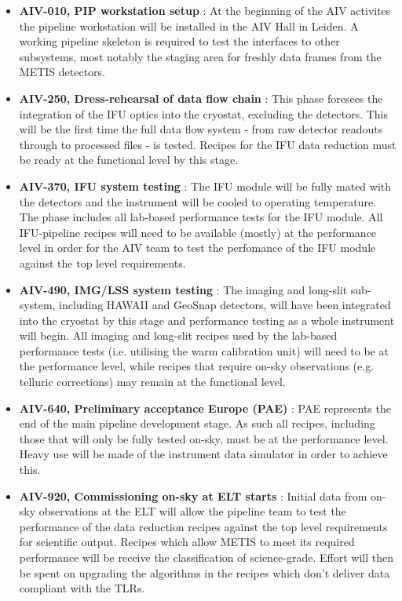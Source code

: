 \documentclass[a4paper]{spie}  %
\begin{document}
\begin{itemize}
    \item \textbf{AIV-010, PIP workstation setup} : At the beginning of the AIV activites the pipeline workstation will be installed in the AIV Hall in Leiden. A working pipeline skeleton is required to test the interfaces to other subsystems, most notably the staging area for freshly data frames from the METIS detectors. 
    \item  \textbf{AIV-250, Dress-rehearsal of data flow chain} : This phase foresees the integration of the IFU optics into the cryostat, excluding the detectors. This will be the first time the full data flow system - from raw detector readouts through to processed files - is tested. Recipes for the IFU data reduction must be ready at the functional level by this stage.
    \item \textbf{AIV-370, IFU system testing} : The IFU module will be fully mated with the detectors and the instrument will be cooled to operating temperature. The phase includes all lab-based performance tests for the IFU module. All IFU-pipeline recipes will need to be available (mostly) at the performance level in order for the AIV team to test the perfomance of the IFU module against the top level requirements.
    \item \textbf{AIV-490, IMG/LSS system testing} : The imaging and long-slit sub-system, including HAWAII and GeoSnap detectors, will have been integrated into the cryostat by this stage and performance testing as a whole instrument will begin. All imaging and long-slit recipes used by the lab-based performance tests (i.e. utilising the warm calibration unit) will need to be at the performance level, while recipes that require on-sky observations (e.g. telluric corrections) may remain at the functional level.
    \item \textbf{AIV-640, Preliminary acceptance Europe (PAE)} : PAE represents the end of the main pipeline development stage. As such all recipes, including those that will only be fully tested on-sky, must be at the performance level. Heavy use will be made of the instrument data simulator in order to achieve this.
    \item \textbf{AIV-920, Commissioning on-sky at ELT starts} : Initial data from on-sky observations at the ELT will allow the pipeline team to test the performance of the data reduction recipes against the top level requirements for scientific output. Recipes which allow METIS to meet its required performance will be receive the classification of science-grade. Effort will then be spent on upgrading the algorithms in the recipes which don't deliver data compliant with the TLRs.
\end{itemize}
\end{document}
